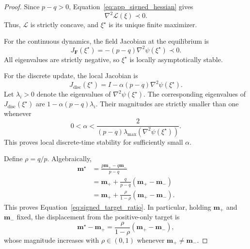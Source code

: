 \documentclass{article}
\theoremstyle{plain}
\theoremstyle{definition}
\theoremstyle{remark}
\begin{document}
\begin{proof}
Since \(p-q>0\), Equation~\eqref{eq:app_signed_hessian} gives
\begin{equation}
    \nabla^2\mathcal L(\xi)
    \prec0.
\end{equation}
Thus, \(\mathcal L\) is strictly concave, and
\(\xi^\star\) is its unique finite maximizer.

For the continuous dynamics, the field Jacobian at the equilibrium is
\begin{equation}
    J_{\mathbf F}(\xi^\star)
    =
    -(p-q)
    \nabla^2\psi(\xi^\star)
    \prec0.
    \label{eq:app_continuous_jacobian}
\end{equation}
All eigenvalues are strictly negative, so
\(\xi^\star\) is locally asymptotically stable.

For the discrete update, the local Jacobian is
\begin{equation}
    J_{\mathrm{disc}}(\xi^\star)
    =
    I
    -
    \alpha(p-q)
    \nabla^2\psi(\xi^\star).
    \label{eq:app_discrete_jacobian}
\end{equation}
Let \(\lambda_i>0\) denote the eigenvalues of
\(\nabla^2\psi(\xi^\star)\). The corresponding eigenvalues of
\(J_{\mathrm{disc}}(\xi^\star)\) are
\(1-\alpha(p-q)\lambda_i\). Their magnitudes are strictly smaller than
one whenever
\begin{equation}
    0
    <
    \alpha
    <
    \frac{
        2
    }{
        (p-q)
        \lambda_{\max}
        \left(
            \nabla^2\psi(\xi^\star)
        \right)
    }.
    \label{eq:app_discrete_stepsize}
\end{equation}
This proves local discrete-time stability for sufficiently small
\(\alpha\).

Define \(\rho=q/p\). Algebraically,
\begin{equation}
\begin{aligned}
    \mathbf m^\star
    &=
    \frac{
        p\mathbf m_+
        -
        q\mathbf m_-
    }{
        p-q
    }
    \\
    &=
    \mathbf m_+
    +
    \frac{q}{p-q}
    \left(
        \mathbf m_+
        -
        \mathbf m_-
    \right)
    \\
    &=
    \mathbf m_+
    +
    \frac{\rho}{1-\rho}
    \left(
        \mathbf m_+
        -
        \mathbf m_-
    \right).
\end{aligned}
\label{eq:app_stable_extrapolation_identity}
\end{equation}
This proves Equation~\eqref{eq:signed_target_ratio}. In particular,
holding \(\mathbf m_+\) and \(\mathbf m_-\) fixed, the displacement from
the positive-only target is
\begin{equation}
    \mathbf m^\star-\mathbf m_+
    =
    \frac{\rho}{1-\rho}
    \left(
        \mathbf m_+
        -
        \mathbf m_-
    \right),
    \label{eq:app_equilibrium_displacement}
\end{equation}
whose magnitude increases with \(\rho\in(0,1)\) whenever
\(\mathbf m_+\neq\mathbf m_-\).


\end{proof}
\end{document}
